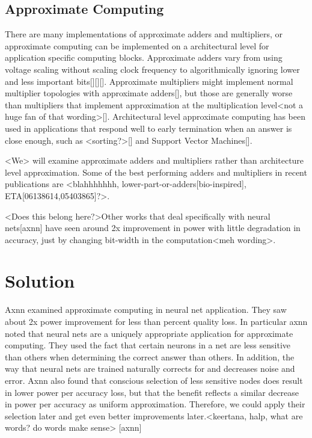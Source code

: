 \documentclass[conference]{IEEEtran}
\begin{document}
\subsection{Approximate Computing}
There are many implementations of approximate adders and multipliers, or approximate computing can be implemented on a architectural level for application specific computing blocks. Approximate adders vary from using voltage scaling without scaling clock frequency to algorithmically ignoring lower and less important bits[][][]. Approximate multipliers might implement normal multiplier topologies with approximate adders[], but those are generally worse than multipliers that implement approximation at the multiplication level<not a huge fan of that wording>[]. Architectural level approximate computing has been used in applications that respond well to early termination when an answer is close enough, such as <sorting?>[] and Support Vector Machines[].

<We> will examine approximate adders and multipliers rather than architecture level approximation. Some of the best performing adders and multipliers in recent publications are <blahhhhhhh, lower-part-or-adders[bio-inspired], ETA[06138614,05403865]?>. 

<Does this belong here?>Other works that deal specifically with neural nets[axnn] have seen around 2x improvement in power with little degradation in accuracy, just by changing bit-width in the computation<meh wording>. 

\section{Solution}


Axnn examined approximate computing in neural net application. They saw about 2x power improvement for less than percent quality loss. In particular axnn noted that neural nets are a uniquely appropriate application for approximate computing. They used the fact that certain neurons in a net are less sensitive than others when determining the correct answer than others. In addition, the way that neural nets are trained naturally corrects for and decreases noise and error. Axnn also found that conscious selection of less sensitive nodes does result in lower power per accuracy loss, but that the benefit reflects a similar decrease in power per accuracy as uniform approximation. Therefore, we could apply their selection later and get even better improvements later.<keertana, halp, what are words? do words make sense> [axnn] 
\end{document}
